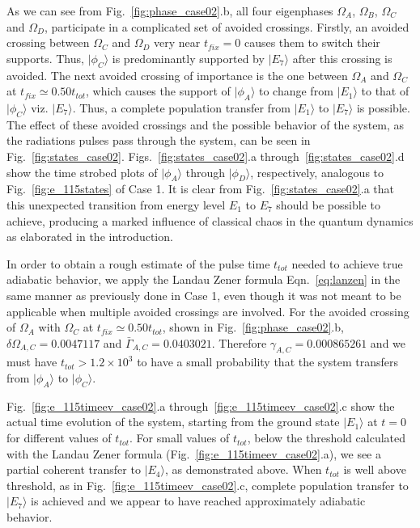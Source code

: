 \documentclass{article}
\begin{document}
As we can see from Fig.~\ref{fig:phase_case02}.b,  all four eigenphases $\Omega_A$, $\Omega_B$, $\Omega_C$ and $\Omega_D$, participate in a complicated set of avoided crossings. Firstly, an avoided crossing between $\Omega_C$ and $\Omega_D$ very near $t_{fix} = 0$ causes them to switch their supports. Thus, $\vert \phi_C \rangle$ is predominantly supported by $\vert E_7\rangle$ after this crossing is avoided. The next avoided crossing of importance is the one between $\Omega_A$ and $\Omega_C$ at $t_{fix}\simeq 0.50 t_{tot}$, which causes the support of $\vert \phi_A \rangle$ to change from $\vert E_1 \rangle$ to that of  $\vert \phi_C\rangle$ viz. $\vert E_7\rangle$. Thus, a complete population transfer from  $\vert E_1\rangle$ to  $\vert E_7\rangle$ is possible. The effect of these avoided crossings and the possible behavior of the  system, as the radiations pulses pass through the system, can be seen in Fig.~\ref{fig:states_case02}. Figs.~\ref{fig:states_case02}.a through~\ref{fig:states_case02}.d show the time strobed plots of $\vert \phi_A \rangle $ through $\vert \phi_D \rangle$, respectively, analogous to Fig.~\ref{fig:e_115states} of Case 1. It is clear from Fig.~\ref{fig:states_case02}.a that this unexpected transition from energy level $E_1$ to $E_7$ should be possible to achieve, producing a marked influence of classical chaos in the quantum dynamics as elaborated in the introduction.

In order to obtain a rough estimate of the pulse time $t_{tot}$ needed to achieve true adiabatic behavior,   we apply the Landau Zener formula  Eqn.~\eqref{eq:lanzen} in the same manner as previously done in Case 1, even though it was not meant to be applicable when multiple avoided crossings are involved. For the avoided crossing of $\Omega_A$ with  $\Omega_C$ at $t_{fix}\simeq 0.50 t_{tot}$, shown in Fig.~\ref{fig:phase_case02}.b, $\delta \Omega_{A,C} = 0.0047117$ and ${\bar \Gamma}_{A,C} = 0.0403021$. Therefore $\gamma_{A,C} = 0.000865261$ and we must have $t_{tot} > 1.2 {\times} 10^3$ to have a small probability that the system transfers from $\vert \phi_A\rangle$ to $\vert \phi_C \rangle$. 

Fig.~\ref{fig:e_115timeev_case02}.a through~\ref{fig:e_115timeev_case02}.c show the actual time evolution of the system, starting from the ground state $|E_1\rangle$ at $t = 0$ for different values of $t_{tot}$. For small values of $t_{tot}$, below the threshold calculated with the Landau Zener formula (Fig.~\ref{fig:e_115timeev_case02}.a), we see a partial coherent transfer to $|E_4\rangle$, as demonstrated above. 
When $t_{tot}$ is well above threshold, as in Fig.~\ref{fig:e_115timeev_case02}.c,  complete population transfer to $|E_7\rangle$ is achieved and we appear to have reached approximately  adiabatic behavior. 
%
%
\end{document}
